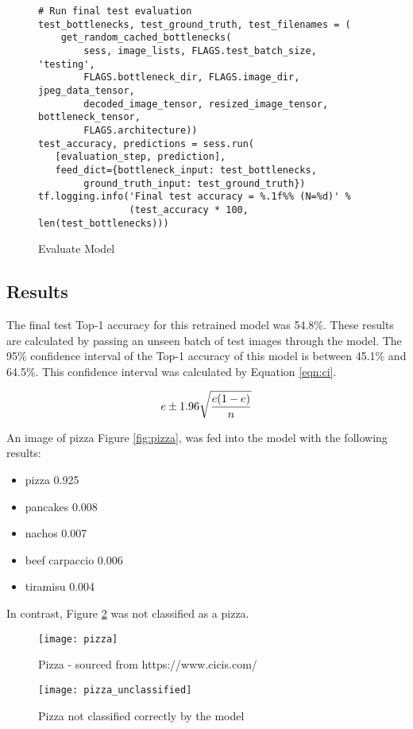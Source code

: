 \begin{figure}
\caption{Evaluate Model \parencite{retrainInception}}
\label{lst:evalModel}
\begin{lstlisting}[style=Python]
# Run final test evaluation
test_bottlenecks, test_ground_truth, test_filenames = (
    get_random_cached_bottlenecks(
        sess, image_lists, FLAGS.test_batch_size, 'testing',
        FLAGS.bottleneck_dir, FLAGS.image_dir, jpeg_data_tensor,
        decoded_image_tensor, resized_image_tensor, bottleneck_tensor,
        FLAGS.architecture))
test_accuracy, predictions = sess.run(
   [evaluation_step, prediction],
   feed_dict={bottleneck_input: test_bottlenecks,
        ground_truth_input: test_ground_truth})
tf.logging.info('Final test accuracy = %.1f%% (N=%d)' %
                (test_accuracy * 100, len(test_bottlenecks)))
\end{lstlisting}
\end{figure}

\tocless\subsection{Results}
The final test Top-1 accuracy for this retrained model was 54.8\%.
These results are calculated by passing an unseen batch of test images through the model.
The 95\% confidence interval of the Top-1 accuracy of this model is between 45.1\% and 64.5\%.
This confidence interval was calculated by Equation \ref{eqn:ci}.

\begin{equation}\label{eqn:ci}
    e \pm 1.96\sqrt{e(1-e) \over n}
\end{equation}

An image of pizza Figure \ref{fig:pizza}, was fed into the model with the following results:
\begin{itemize}
    \item{pizza 0.925}
    \item{pancakes 0.008}
    \item{nachos 0.007}
    \item{beef carpaccio 0.006}
    \item{tiramisu 0.004}
\end{itemize}
In contrast, Figure \ref{fig:pizza_unclassified} was not classified as a pizza.

\begin{figure}[h] 
\centering
  \label{pizzas} 
  \begin{minipage}[h]{0.5\linewidth}
    \centering
    \texttt{[image: pizza]} 
    \caption{Pizza - sourced from https://www.cicis.com/} 
  \label{fig:pizza}
    \vspace{4ex}
  \end{minipage}%
  \begin{minipage}[h]{0.5\linewidth}
    \centering
    \texttt{[image: pizza\_unclassified]} 
    \caption{Pizza not classified correctly by the model} 
  \label{fig:pizza_unclassified}
    \vspace{4ex}
  \end{minipage} 
\end{figure}

